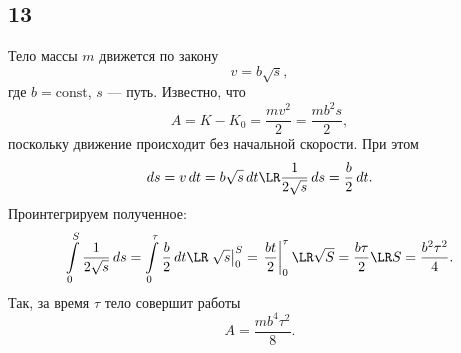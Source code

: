 \subsection{13}

Тело массы $m$ движется по закону
\[
v=b\sqrt s,
\]
где $b=\text{const}$, $s$ --- путь. Известно, что
\[
A=K-K_0=\frac{mv^2}{2}=\frac{mb^2s}{2},
\]
поскольку движение происходит без начальной скорости. При этом
\[
ds=v\,dt=b\sqrt s\,dt\LR \frac{1}{2\sqrt s}\,ds=\frac{b}{2}\,dt.
\]
Проинтегрируем полученное:
\[
\int\limits_0^S\frac{1}{2\sqrt s}\,ds=\int\limits_0^\tau\frac{b}{2}\,dt\LR \left.\sqrt s\right\vert_0^S=\left.\frac{bt}{2}\right\vert_0^\tau\LR\sqrt S=\frac{b\tau}{2}\LR S=\frac{b^2\tau^2}{4}.
\]
Так, за время $\tau$ тело совершит работы
\[
A=\frac{mb^4\tau^2}{8}.
\]